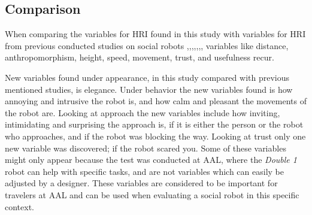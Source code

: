 \subsection{Comparison}
When comparing the variables for HRI found in this study with variables for HRI from previous conducted studies on social robots \cite{PDF:ExploringInfluencingVariable},\cite{PDF:SharingALifeHarvey},\cite{PDF:HowMayIServeYou},\cite{PDF:CloseButNotStuck},\cite{PDF:TheImpactOfTraveler},\cite{PDF:HumanRobotEmodiedInteraction},\cite{PDF:RecommendationEffects}, variables like distance, anthropomorphism, height, speed, movement, trust, and usefulness recur. 

New variables found under appearance, in this study compared with previous mentioned studies, is elegance. Under behavior the new variables found is how annoying and intrusive the robot is, and how calm and pleasant the movements of the robot are. Looking at approach the new variables include how inviting, intimidating and surprising the approach is, if it is either the person or the robot who approaches, and if the robot was blocking the way. Looking at trust only one new variable was discovered; if the robot scared you. Some of these variables might only appear because the test was conducted at AAL, where the \textit{Double 1} robot can help with specific tasks, and are not variables which can easily be adjusted by a designer. These variables are considered to be important for travelers at AAL and can be used when evaluating a social robot in this specific context. 